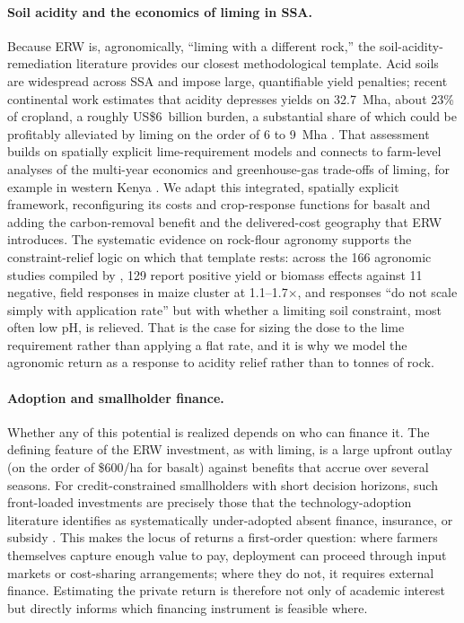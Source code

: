 \documentclass[12pt]{article}
\begin{document}
\paragraph{Soil acidity and the economics of liming in SSA.}
Because ERW is, agronomically, ``liming with a different rock,'' the
soil-acidity-remediation literature provides our closest methodological template.
Acid soils are widespread across SSA and impose large, quantifiable yield
penalties; recent continental work estimates that acidity depresses yields on
32.7~Mha, about 23\% of cropland, a roughly US\$6~billion burden, a substantial
share of which could be profitably alleviated by liming on the order of 6 to
9~Mha \citep{vascosilva2025}. That assessment builds on spatially explicit
lime-requirement models \citep{aramburumerlos2023} and connects to farm-level
analyses of the multi-year economics and greenhouse-gas trade-offs of liming, for
example in western Kenya \citep{hijbeek2021}. We adapt this integrated, spatially
explicit framework, reconfiguring its costs and crop-response functions for
basalt and adding the carbon-removal benefit and the delivered-cost geography that
ERW introduces. The systematic evidence on rock-flour agronomy supports the
constraint-relief logic on which that template rests: across the 166 agronomic
studies compiled by \citet[\S7.3]{suhrhoff2026esroc}, 129 report positive yield
or biomass effects against 11 negative, field responses in maize cluster at
1.1--1.7$\times$, and responses ``do not scale simply with application rate''
but with whether a limiting soil constraint, most often low pH, is relieved.
That is the case for sizing the dose to the lime requirement rather than
applying a flat rate, and it is why we model the agronomic return as a response
to acidity relief rather than to tonnes of rock.

\paragraph{Adoption and smallholder finance.}
Whether any of this potential is realized depends on who can finance it. The
defining feature of the ERW investment, as with liming, is a large upfront outlay
(on the order of \$600/ha for basalt) against benefits that accrue over several
seasons. For credit-constrained smallholders with short decision horizons, such
front-loaded investments are precisely those that the technology-adoption
literature identifies as systematically under-adopted absent finance, insurance,
or subsidy \citep{jack2013market}. This makes the locus of returns a first-order
question: where farmers themselves capture enough value to pay, deployment can
proceed through input markets or cost-sharing arrangements; where they do not, it
requires external finance. Estimating the private return is therefore not only of
academic interest but directly informs which financing instrument is feasible
where.
\end{document}
